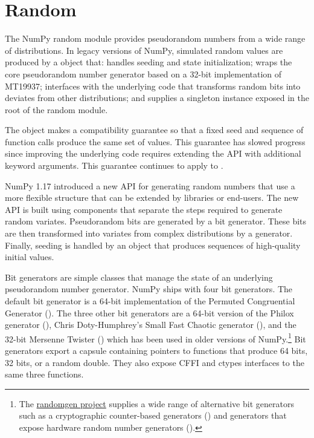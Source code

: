 \section*{Random}

The NumPy random module provides pseudorandom numbers from a wide range of
distributions. In legacy versions of NumPy, simulated random values are produced
by a  object that: handles seeding and state initialization;
wraps the core pseudorandom number generator based on a 32-bit implementation of
MT19937; interfaces with the underlying code that transforms random bits into
deviates from other distributions; and supplies a singleton instance exposed in
the root of the random module.

The  object makes a compatibility guarantee so that a fixed
seed and sequence of function calls produce the same set of values. This
guarantee has slowed progress since improving the underlying code requires
extending the API with additional keyword arguments. This guarantee continues to
apply to . 

NumPy 1.17 introduced a new API for generating random numbers that use a more
flexible structure that can be extended by libraries or end-users. The new API
is built using components that separate the steps required to generate random
variates. Pseudorandom bits are generated by a bit generator. These bits are
then transformed into variates from complex distributions by a generator.
Finally, seeding is handled by an object that produces sequences of high-quality
initial values.

Bit generators are simple classes that manage the state of an underlying
pseudorandom number generator. NumPy ships with four bit generators. The default
bit generator is a 64-bit implementation of the Permuted Congruential Generator
\cite{pcg64} (). The three other bit generators are a 64-bit version
of the Philox generator\cite{random123} (), Chris Doty-Humphrey's
Small Fast Chaotic generator\cite{practrand} (), and the 32-bit
Mersenne Twister\cite{mt19937} () which has been used in older
versions of NumPy.\footnote{The
\href{https://github.com/bashtage/randomgen}{randomgen project} supplies a wide
range of alternative bit generators such as a cryptographic counter-based
generators () and generators that expose hardware random number
generators ()\cite{randomgen}.} Bit generators export a capsule
containing pointers to functions that produce 64 bits, 32 bits, or a random
double. They also expose CFFI and ctypes interfaces to the same three functions.

